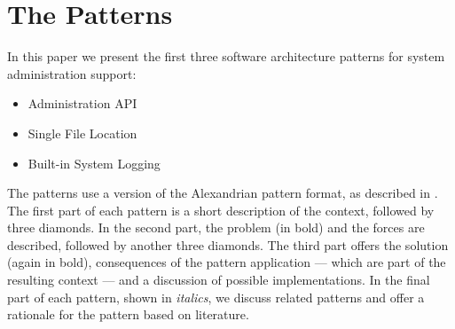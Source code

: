 \section{The Patterns}

In this paper we present the first three software architecture patterns for system administration support: 
\begin{itemize} 
	\item {\sc Administration API}
	\item {\sc Single File Location}
	\item {\sc Built-in System Logging}
\end{itemize}

The patterns use a version of the Alexandrian pattern format, as described in \cite{alexander1977}. The first part of each pattern is a short description of the context, followed by three diamonds. In the second part, the problem (in bold) and the forces are described, followed by another three diamonds. The third part offers the solution (again in bold), consequences of the pattern application --- which are part of the resulting context --- and a discussion of possible implementations. In the final part of each pattern, shown in \textit{italics}, we discuss related patterns and offer a rationale for the pattern based on literature.
